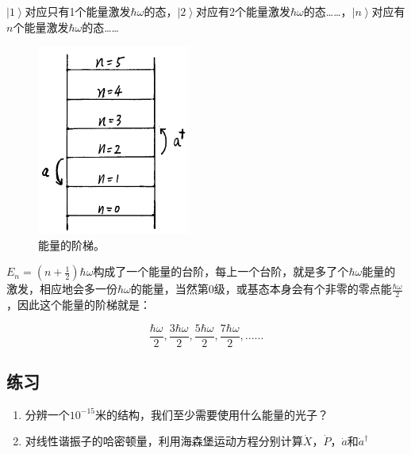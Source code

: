 $\left| 1 \right\rangle$对应只有1个能量激发$\hbar \omega$的态，$\left| 2 \right\rangle$对应有2个能量激发$\hbar \omega$的态……，$\left| n \right\rangle$对应有$n$个能量激发$\hbar \omega$的态……

\begin{figure}[htbp]
\begin{center}
\includegraphics[width=5cm]{LinearOscillator/ladder.png}
\caption{能量的阶梯。}
\label{default}
\end{center}
\end{figure}

$E_n = \left( n + \frac{1}{2}  \right) \hbar \omega$构成了一个能量的台阶，每上一个台阶，就是多了个$\hbar \omega$能量的激发，相应地会多一份$\hbar \omega$的能量，当然第0级，或基态本身会有个非零的零点能$\frac{\hbar \omega}{2}$，因此这个能量的阶梯就是：

\begin{equation*}
\frac{\hbar \omega}{2}, \frac{3 \hbar \omega}{2}, \frac{5 \hbar \omega}{2}, \frac{7 \hbar \omega}{2}, ......
\end{equation*}

\subsection*{练习}

\begin{enumerate}
\item 

分辨一个$10^{-15}$米的结构，我们至少需要使用什么能量的光子？

\item

对线性谐振子的哈密顿量，利用海森堡运动方程分别计算$\dot X$，$\dot P$，$\dot a$和$\dot a^\dagger$

\end{enumerate}



